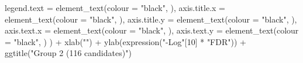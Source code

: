 \documentclass[
  11pt,
  oneside]{book}
\newenvironment{Shaded}{\begin{snugshade}}{\end{snugshade}}
\newcommand{\AttributeTok}[1]{\textcolor[rgb]{0.77,0.63,0.00}{#1}}
\newcommand{\DecValTok}[1]{\textcolor[rgb]{0.00,0.00,0.81}{#1}}
\newcommand{\FunctionTok}[1]{\textcolor[rgb]{0.00,0.00,0.00}{#1}}
\newcommand{\NormalTok}[1]{#1}
\newcommand{\SpecialCharTok}[1]{\textcolor[rgb]{0.00,0.00,0.00}{#1}}
\newcommand{\StringTok}[1]{\textcolor[rgb]{0.31,0.60,0.02}{#1}}
\begin{document}
\begin{Shaded}
\begin{Highlighting}[]
    \AttributeTok{legend.text =} \FunctionTok{element\_text}\NormalTok{(}\AttributeTok{colour =} \StringTok{"black"}\NormalTok{, ),}
    \AttributeTok{axis.title.x =} \FunctionTok{element\_text}\NormalTok{(}\AttributeTok{colour =} \StringTok{"black"}\NormalTok{, ),}
    \AttributeTok{axis.title.y =} \FunctionTok{element\_text}\NormalTok{(}\AttributeTok{colour =} \StringTok{"black"}\NormalTok{, ),}
    \AttributeTok{axis.text.x =} \FunctionTok{element\_text}\NormalTok{(}\AttributeTok{colour =} \StringTok{"black"}\NormalTok{, ),}
    \AttributeTok{axis.text.y =} \FunctionTok{element\_text}\NormalTok{(}\AttributeTok{colour =} \StringTok{"black"}\NormalTok{, )}
\NormalTok{  ) }\SpecialCharTok{+}
  \FunctionTok{xlab}\NormalTok{(}\StringTok{""}\NormalTok{) }\SpecialCharTok{+}
  \FunctionTok{ylab}\NormalTok{(}\FunctionTok{expression}\NormalTok{(}\StringTok{"{-}Log"}\NormalTok{[}\DecValTok{10}\NormalTok{] }\SpecialCharTok{*} \StringTok{"FDR"}\NormalTok{)) }\SpecialCharTok{+}
  \FunctionTok{ggtitle}\NormalTok{(}\StringTok{"Group 2 (116 candidates)"}\NormalTok{)}
\end{Highlighting}
\end{Shaded}
\end{document}
